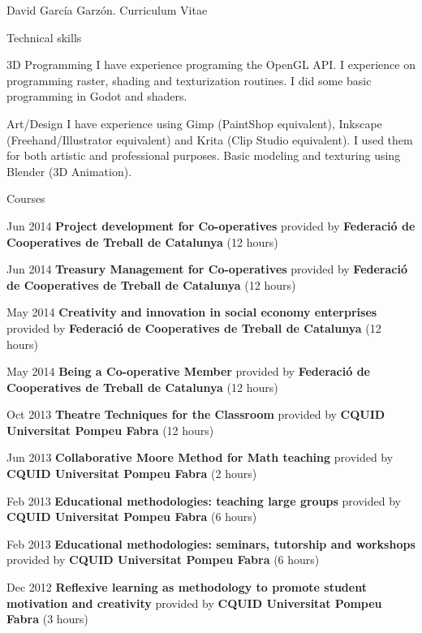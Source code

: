 \documentclass{article}
\begin{document}
\begin{cv}{David García Garzón. Curriculum Vitae}
\begin{cvlist}{Technical skills}
\item[3D Programming]
	I have experience programing the OpenGL API.
I experience on programming raster, shading and texturization routines.
I did some basic programming in Godot and shaders.


\item[Art/Design]
	I have experience using Gimp (PaintShop equivalent), Inkscape (Freehand/Illustrator equivalent) and Krita (Clip Studio equivalent).
I used them for both artistic and professional purposes.
Basic modeling and texturing using Blender (3D Animation).


\end{cvlist}

\begin{cvlist}{Courses}

\item[Jun 2014]
	{\bf Project development for Co-operatives } provided by {\bf Federació de Cooperatives de Treball de Catalunya} (12 hours)

\item[Jun 2014]
	{\bf Treasury Management for Co-operatives } provided by {\bf Federació de Cooperatives de Treball de Catalunya} (12 hours)

\item[May 2014]
	{\bf Creativity and innovation in social economy enterprises } provided by {\bf Federació de Cooperatives de Treball de Catalunya} (12 hours)

\item[May 2014]
	{\bf Being a Co-operative Member } provided by {\bf Federació de Cooperatives de Treball de Catalunya} (12 hours)

\item[Oct 2013]
	{\bf Theatre Techniques for the Classroom } provided by {\bf CQUID Universitat Pompeu Fabra} (12 hours)

\item[Jun 2013]
	{\bf Collaborative Moore Method for Math teaching } provided by {\bf CQUID Universitat Pompeu Fabra} (2 hours)

\item[Feb 2013]
	{\bf Educational methodologies: teaching large groups } provided by {\bf CQUID Universitat Pompeu Fabra} (6 hours)

\item[Feb 2013]
	{\bf Educational methodologies: seminars, tutorship and workshops } provided by {\bf CQUID Universitat Pompeu Fabra} (6 hours)

\item[Dec 2012]
	{\bf Reflexive learning as methodology to promote student motivation and creativity } provided by {\bf CQUID Universitat Pompeu Fabra} (3 hours)


\end{cvlist}
\end{cv}
\end{document}
